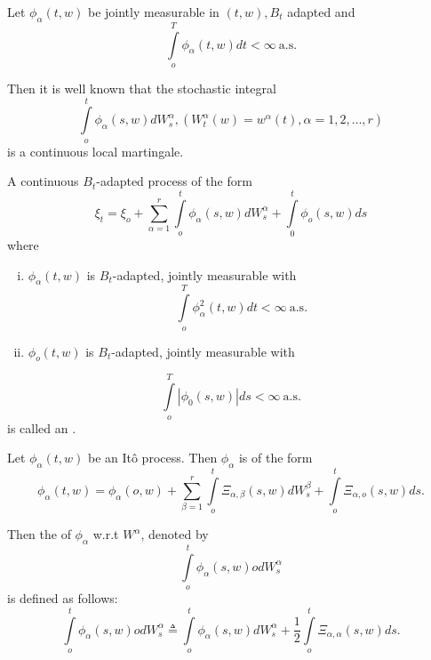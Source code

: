 \medskip
{}
 Let $\phi_\alpha (t,w)$ be jointly measurable in $(t,w), B_t$ adapted
 and   
$$
\int\limits_o^T \phi_\alpha (t,w) dt < \infty ~\text{a.s.}
$$

Then it is well known that the stochastic integral
$$
\int\limits_o^t \phi_\alpha (s,w) dW^\alpha_s, (W^\alpha_t (w) =
w^\alpha (t), \alpha = 1,2, \ldots, r) 
$$
is a continuous local martingale.


\medskip
{}
 A continuous $B_t$-adapted process of the form 
$$
\xi_t = \xi_o + \sum_{\alpha=1}^r \int\limits_{o}^t \phi_\alpha (s,w)
dW^\alpha_s + \int\limits_0^t \phi_o (s,w)ds 
$$
where
\begin{enumerate}[i)]
\item $\phi_\alpha(t,w)$ is $B_t$-adapted, jointly measurable with 
  $$
  \int\limits_o^T \phi^2_\alpha (t,w) dt < \infty ~\text{a.s.}
  $$ 

\item $\phi_o(t,w)$ is $B_t$-adapted, jointly measurable with 
\end{enumerate}
$$
\int\limits_o^T |\phi_0 (s,w)| ds < \infty ~\text{a.s.}
$$\pageoriginale
is called an .


\medskip
{}
 Let $\phi_\alpha(t,w)$ be an It\^{o} process. Then $\phi_\alpha$
 is of the form  
$$
\phi_\alpha(t,w)= \phi_\alpha(o,w) + \sum_{\beta = 1}^r
\int\limits_o^t \Xi_{\alpha,\beta} (s,w)dW^\beta_s + \int\limits_o^t
\Xi_{\alpha,o} (s,w)ds. 
$$

Then the  of $\phi_\alpha$ w.r.t
$W^\alpha$, denoted by
$$
\int\limits_o^t \phi_\alpha (s,w) o dW^\alpha_s 
$$
is defined as follows:
$$
\int\limits_o^t \phi_\alpha (s,w ) odW^\alpha_s \triangleq
\int\limits_o^t \phi_\alpha (s,w ) dW^\alpha_s + \frac{1}{2}
\int\limits_o^t \Xi_{\alpha,\alpha}(s,w)ds.
$$


